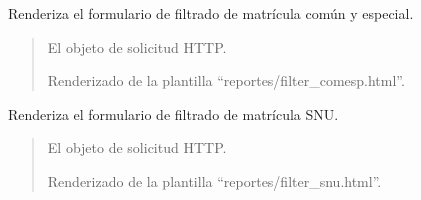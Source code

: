 \documentclass[letterpaper,10pt,spanish]{sphinxmanual}
\begin{document}
\begin{fulllineitems}

\pysigstartsignatures
{}
\pysigstopsignatures
\sphinxAtStartPar
Renderiza el formulario de filtrado de matrícula común y especial.
\begin{quote}\begin{description}
\sphinxAtStartPar
{} \textendash{} El objeto de solicitud HTTP.

\sphinxAtStartPar
Renderizado de la plantilla “reportes/filter\_comesp.html”.

\end{description}\end{quote}

\end{fulllineitems}



\begin{fulllineitems}

\pysigstartsignatures
{}
\pysigstopsignatures
\sphinxAtStartPar
Renderiza el formulario de filtrado de matrícula SNU.
\begin{quote}\begin{description}
\sphinxAtStartPar
{} \textendash{} El objeto de solicitud HTTP.

\sphinxAtStartPar
Renderizado de la plantilla “reportes/filter\_snu.html”.

\end{description}\end{quote}

\end{fulllineitems}
\end{document}
